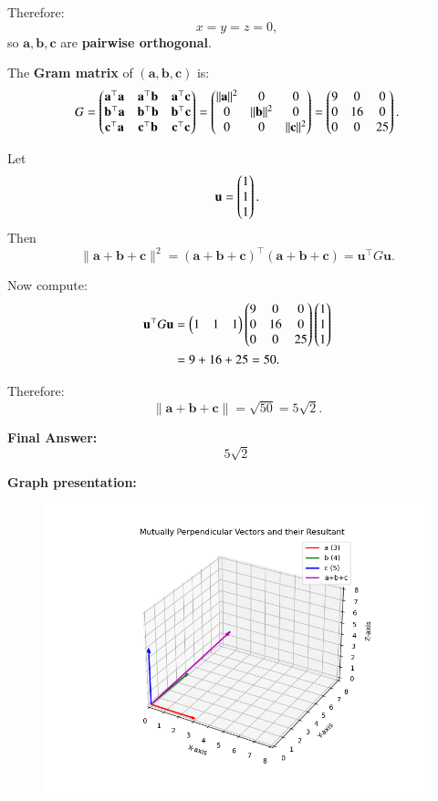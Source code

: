 \documentclass[journal]{IEEEtran}
\begin{document}
Therefore:
\begin{equation} \label{eq9}
x = y = z = 0,
\end{equation}
so $\mathbf{a}, \mathbf{b}, \mathbf{c}$ are \textbf{pairwise orthogonal}.

\bigskip

The \textbf{Gram matrix} of $ (\mathbf{a}, \mathbf{b}, \mathbf{c}) $ is:
\begin{equation} \label{eq10}
G =
\begin{pmatrix}
\mathbf{a}^\top \mathbf{a} & \mathbf{a}^\top \mathbf{b} & \mathbf{a}^\top \mathbf{c} \\
\mathbf{b}^\top \mathbf{a} & \mathbf{b}^\top \mathbf{b} & \mathbf{b}^\top \mathbf{c} \\
\mathbf{c}^\top \mathbf{a} & \mathbf{c}^\top \mathbf{b} & \mathbf{c}^\top \mathbf{c}
\end{pmatrix}
=
\begin{pmatrix}
\|\mathbf{a}\|^2 & 0 & 0 \\
0 & \|\mathbf{b}\|^2 & 0 \\
0 & 0 & \|\mathbf{c}\|^2
\end{pmatrix}
=
\begin{pmatrix}
9 & 0 & 0 \\
0 & 16 & 0 \\
0 & 0 & 25
\end{pmatrix}.
\end{equation}

Let
\[
\mathbf{u} = \begin{pmatrix}1 \\ 1 \\ 1\end{pmatrix}.
\]
Then
\begin{equation} \label{eq11}
\|\mathbf{a} + \mathbf{b} + \mathbf{c}\|^2 = (\mathbf{a} + \mathbf{b} + \mathbf{c})^\top (\mathbf{a} + \mathbf{b} + \mathbf{c}) = \mathbf{u}^\top G \mathbf{u}.
\end{equation}

Now compute:
\begin{align}
\mathbf{u}^\top G \mathbf{u} 
&= \begin{pmatrix}1 & 1 & 1\end{pmatrix}
\begin{pmatrix}
9 & 0 & 0 \\
0 & 16 & 0 \\
0 & 0 & 25
\end{pmatrix}
\begin{pmatrix}1 \\ 1 \\ 1\end{pmatrix} \nonumber \\
&= 9 + 16 + 25 = 50. \label{eq12}
\end{align}

Therefore:
\begin{equation} \label{eq13}
\|\mathbf{a} + \mathbf{b} + \mathbf{c}\| = \sqrt{50} = 5\sqrt{2}.
\end{equation}

\bigskip

\textbf{Final Answer:}
\[
\boxed{5\sqrt{2}}
\]

\textbf{Graph presentation:}
\begin{figure}[H]
\begin{center}
\includegraphics[width=0.6\columnwidth]{figs/fig4.png}
\end{center}
\caption{}
\label{fig:Fig}
\end{figure}    
\end{document}
